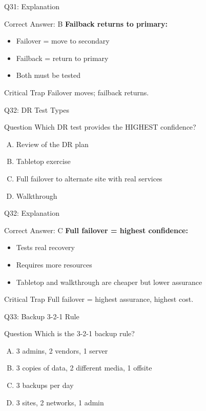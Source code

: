 \documentclass{beamer}
\begin{document}
	\begin{frame}{Q31: Explanation}
		\begin{block}{Correct Answer: B}
			\textbf{Failback returns to primary:}
			\begin{itemize}
				\item Failover = move to secondary
				\item Failback = return to primary
				\item Both must be tested
			\end{itemize}
		\end{block}
		\begin{alertblock}{Critical Trap}
			Failover moves; failback returns.
		\end{alertblock}
	\end{frame}
	
	\begin{frame}{Q32: DR Test Types}
		\begin{block}{Question}
			Which DR test provides the HIGHEST confidence?
		\end{block}
		\begin{enumerate}[(A)]
			\item Review of the DR plan
			\item Tabletop exercise
			\item Full failover to alternate site with real services
			\item Walkthrough
		\end{enumerate}
	\end{frame}
	
	\begin{frame}{Q32: Explanation}
		\begin{block}{Correct Answer: C}
			\textbf{Full failover = highest confidence:}
			\begin{itemize}
				\item Tests real recovery
				\item Requires more resources
				\item Tabletop and walkthrough are cheaper but lower assurance
			\end{itemize}
		\end{block}
		\begin{alertblock}{Critical Trap}
			Full failover = highest assurance, highest cost.
		\end{alertblock}
	\end{frame}
	
	\begin{frame}{Q33: Backup 3-2-1 Rule}
		\begin{block}{Question}
			Which is the 3-2-1 backup rule?
		\end{block}
		\begin{enumerate}[(A)]
			\item 3 admins, 2 vendors, 1 server
			\item 3 copies of data, 2 different media, 1 offsite
			\item 3 backups per day
			\item 3 sites, 2 networks, 1 admin
		\end{enumerate}
	\end{frame}
	
\end{document}

